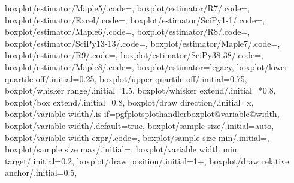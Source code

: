 {	boxplot/estimator/Maple5/.code={\def\pgfplots@boxplot@estimator{R6}},
	boxplot/estimator/R7/.code={\def\pgfplots@boxplot@estimator{R7}},
	boxplot/estimator/Excel/.code={\def\pgfplots@boxplot@estimator{R7}},
	boxplot/estimator/SciPy1-1/.code={\def\pgfplots@boxplot@estimator{R7}},
	boxplot/estimator/Maple6/.code={\def\pgfplots@boxplot@estimator{R7}},
	boxplot/estimator/R8/.code={\def\pgfplots@boxplot@estimator{R8}},
	boxplot/estimator/SciPy13-13/.code={\def\pgfplots@boxplot@estimator{R8}},
	boxplot/estimator/Maple7/.code={\def\pgfplots@boxplot@estimator{R8}},
	boxplot/estimator/R9/.code={\def\pgfplots@boxplot@estimator{R9}},
	boxplot/estimator/SciPy38-38/.code={\def\pgfplots@boxplot@estimator{R9}},
	boxplot/estimator/Maple8/.code={\def\pgfplots@boxplot@estimator{R9}},
	boxplot/estimator=legacy,
	boxplot/lower quartile off/.initial=0.25,
	boxplot/upper quartile off/.initial=0.75,
	boxplot/whisker range/.initial=1.5,
	boxplot/whisker extend/.initial=*0.8,
	boxplot/box extend/.initial=0.8,
	boxplot/draw direction/.initial=x,
	boxplot/variable width/.is if=pgfplotsplothandlerboxplot@variable@width,
	boxplot/variable width/.default=true,
	boxplot/sample size/.initial=auto,
	boxplot/variable width expr/.code=,
	boxplot/sample size min/.initial=,
	boxplot/sample size max/.initial=,
	boxplot/variable width min target/.initial=0.2,
	boxplot/draw position/.initial=1+\plotnumofactualtype,
	boxplot/draw relative anchor/.initial=0.5,
}
